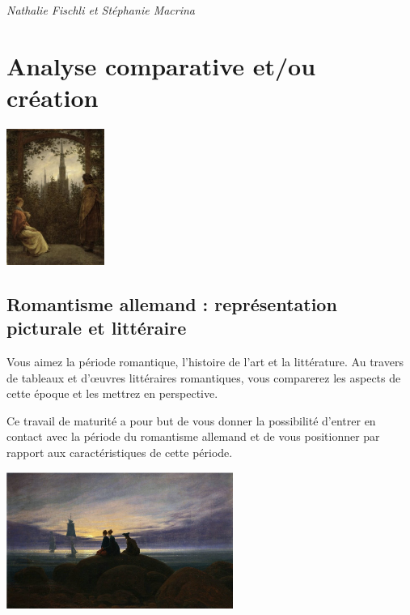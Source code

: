 \documentclass[
  10pt,
  french,
  a5paper,
  openany]{book}
\newenvironment{signature}{\begin{flushright}}{\end{flushright}}
\begin{document}
\begin{signature}
\emph{Nathalie Fischli et Stéphanie Macrina}

\end{signature}

\hypertarget{analyse-comparative-etou-creux301ation}{%
\chapter{Analyse comparative et/ou création}\label{analyse-comparative-etou-creux301ation}}

\begin{center}
\includegraphics[width=\textwidth,height=12em]{images/analyse-comparative-et-ou-creation-1.jpg}

\end{center}

\hypertarget{romantisme-allemand-repreux301sentation-picturale-et-litteux301raire}{%
\section*{Romantisme allemand : représentation picturale et littéraire}\label{romantisme-allemand-repreux301sentation-picturale-et-litteux301raire}}

Vous aimez la période romantique, l'histoire de l'art et la littérature. Au travers de tableaux et d'œuvres littéraires romantiques, vous comparerez les aspects de cette époque et les mettrez en perspective.

Ce travail de maturité a pour but de vous donner la possibilité d'entrer en contact avec la période du romantisme allemand et de vous positionner par rapport aux caractéristiques de cette période.

\begin{center}
\includegraphics[width=\textwidth,height=12em]{images/analyse-comparative-et-ou-creation-2.jpg}

\end{center}
\end{document}

